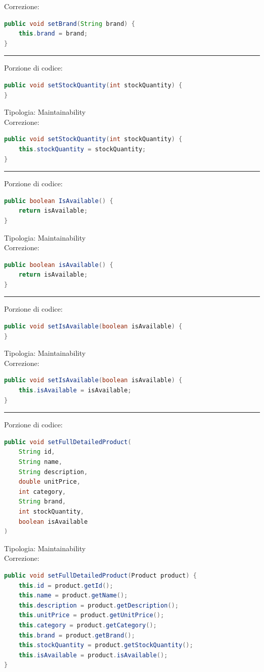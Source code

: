 \documentclass{article}
\begin{document}
Correzione:
\begin{lstlisting}[language=Java]
public void setBrand(String brand) {
    this.brand = brand;
}
\end{lstlisting}
\vspace{.5em}\hrule\vspace{.5em}
Porzione di codice:
\begin{lstlisting}[language=Java]
public void setStockQuantity(int stockQuantity) {
}
\end{lstlisting}
Tipologia: Maintainability\\
Correzione:
\begin{lstlisting}[language=Java]
public void setStockQuantity(int stockQuantity) {
    this.stockQuantity = stockQuantity;
}
\end{lstlisting}
\vspace{.5em}\hrule\vspace{.5em}
Porzione di codice:
\begin{lstlisting}[language=Java]
public boolean IsAvailable() {
    return isAvailable;
}
\end{lstlisting}
Tipologia: Maintainability\\
Correzione:
\begin{lstlisting}[language=Java]
public boolean isAvailable() {
    return isAvailable;
}
\end{lstlisting}
\vspace{.5em}\hrule\vspace{.5em}
Porzione di codice:
\begin{lstlisting}[language=Java]
public void setIsAvailable(boolean isAvailable) {
}
\end{lstlisting}
Tipologia: Maintainability\\
Correzione:
\begin{lstlisting}[language=Java]
public void setIsAvailable(boolean isAvailable) {
    this.isAvailable = isAvailable;
}
\end{lstlisting}
\vspace{.5em}\hrule\vspace{.5em}
Porzione di codice:
\begin{lstlisting}[language=Java]
public void setFullDetailedProduct(
    String id, 
    String name, 
    String description, 
    double unitPrice, 
    int category, 
    String brand, 
    int stockQuantity, 
    boolean isAvailable
)
\end{lstlisting}
Tipologia: Maintainability\\
Correzione:
\begin{lstlisting}[language=Java]
public void setFullDetailedProduct(Product product) {
    this.id = product.getId();
    this.name = product.getName();
    this.description = product.getDescription();
    this.unitPrice = product.getUnitPrice();
    this.category = product.getCategory();
    this.brand = product.getBrand();
    this.stockQuantity = product.getStockQuantity();
    this.isAvailable = product.isAvailable();
}
\end{lstlisting}
\end{document}
